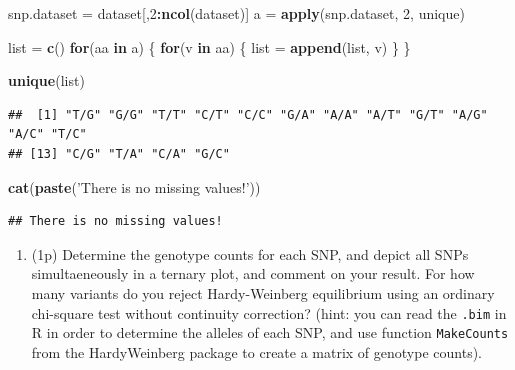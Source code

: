 \documentclass[
]{article}
\newenvironment{Shaded}{\begin{snugshade}}{\end{snugshade}}
\newcommand{\ControlFlowTok}[1]{\textcolor[rgb]{0.13,0.29,0.53}{\textbf{#1}}}
\newcommand{\DecValTok}[1]{\textcolor[rgb]{0.00,0.00,0.81}{#1}}
\newcommand{\KeywordTok}[1]{\textcolor[rgb]{0.13,0.29,0.53}{\textbf{#1}}}
\newcommand{\NormalTok}[1]{#1}
\newcommand{\OperatorTok}[1]{\textcolor[rgb]{0.81,0.36,0.00}{\textbf{#1}}}
\newcommand{\StringTok}[1]{\textcolor[rgb]{0.31,0.60,0.02}{#1}}
\providecommand{\tightlist}{%
  \setlength{\itemsep}{0pt}\setlength{\parskip}{0pt}}
\begin{document}
\begin{Shaded}
\begin{Highlighting}[]
\NormalTok{snp.dataset =}\StringTok{ }\NormalTok{dataset[,}\DecValTok{2}\OperatorTok{:}\KeywordTok{ncol}\NormalTok{(dataset)]}
\NormalTok{a =}\StringTok{ }\KeywordTok{apply}\NormalTok{(snp.dataset, }\DecValTok{2}\NormalTok{, unique)}

\NormalTok{list =}\StringTok{ }\KeywordTok{c}\NormalTok{()}
\ControlFlowTok{for}\NormalTok{(aa }\ControlFlowTok{in}\NormalTok{ a) \{}
  \ControlFlowTok{for}\NormalTok{(v }\ControlFlowTok{in}\NormalTok{ aa) \{}
\NormalTok{    list =}\StringTok{ }\KeywordTok{append}\NormalTok{(list, v)}
\NormalTok{  \}}
\NormalTok{\}}

\KeywordTok{unique}\NormalTok{(list)}
\end{Highlighting}
\end{Shaded}

\begin{verbatim}
##  [1] "T/G" "G/G" "T/T" "C/T" "C/C" "G/A" "A/A" "A/T" "G/T" "A/G" "A/C" "T/C"
## [13] "C/G" "T/A" "C/A" "G/C"
\end{verbatim}

\begin{Shaded}
\begin{Highlighting}[]
\KeywordTok{cat}\NormalTok{(}\KeywordTok{paste}\NormalTok{(}\StringTok{'There is no missing values!'}\NormalTok{))}
\end{Highlighting}
\end{Shaded}

\begin{verbatim}
## There is no missing values!
\end{verbatim}

\begin{enumerate}
\def\labelenumi{\arabic{enumi}.}
\setcounter{enumi}{2}
\tightlist
\item
  (1p) Determine the genotype counts for each SNP, and depict all SNPs
  simultaeneously in a ternary plot, and comment on your result. For how
  many variants do you reject Hardy-Weinberg equilibrium using an
  ordinary chi-square test without continuity correction? (hint: you can
  read the \texttt{.bim} in R in order to determine the alleles of each
  SNP, and use function \texttt{MakeCounts} from the HardyWeinberg
  package to create a matrix of genotype counts).
\end{enumerate}
\end{document}
